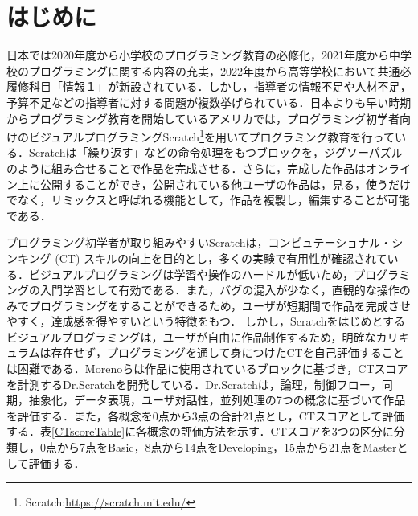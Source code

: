 \documentclass[submit,techrep,noauthor]{ipsj}
\begin{document}
\section{はじめに}

日本では2020年度から小学校のプログラミング教育の必修化，2021年度から中学校のプログラミングに関する内容の充実，2022年度から高等学校において共通必履修科目「情報１」が新設されている\cite{monkashou}．しかし，指導者の情報不足や人材不足，予算不足などの指導者に対する問題が複数挙げられている\cite{monkashou2}．日本よりも早い時期からプログラミング教育を開始しているアメリカでは，プログラミング初学者向けのビジュアルプログラミングScratch\footnote{Scratch:\url{https://scratch.mit.edu/}}\cite{resnick2009scratch}を用いてプログラミング教育を行っている．Scratchは「繰り返す」などの命令処理をもつブロックを，ジグソーパズルのように組み合せることで作品を完成させる．さらに，完成した作品はオンライン上に公開することができ，公開されている他ユーザの作品は，見る，使うだけでなく，リミックスと呼ばれる機能として，作品を複製し，編集することが可能である．

プログラミング初学者が取り組みやすいScratchは，コンピュテーショナル・シンキング (CT) \cite{wing2006computational}スキルの向上を目的とし，多くの実験で有用性が確認されている\cite{10.1145/2724660.2724674}\cite{hashitani2022scratch}\cite{10.1145/2818048.2819984}．ビジュアルプログラミングは学習や操作のハードルが低いため，プログラミングの入門学習として有効である\cite{1050845762811356288}．また，バグの混入が少なく，直観的な操作のみでプログラミングをすることができるため，ユーザが短期間で作品を完成させやすく，達成感を得やすいという特徴をもつ．
しかし，Scratchをはじめとするビジュアルプログラミングは，ユーザが自由に作品制作するため，明確なカリキュラムは存在せず，プログラミングを通して身につけたCTを自己評価することは困難である．Morenoらは作品に使用されているブロックに基づき，CTスコアを計測するDr.Scratchを開発している\cite{moreno2015dr}．Dr.Scratchは，論理，制御フロー，同期，抽象化，データ表現，ユーザ対話性，並列処理の7つの概念に基づいて作品を評価する．また，各概念を0点から3点の合計21点とし，CTスコアとして評価する．表\ref{CTscoreTable}に各概念の評価方法を示す．CTスコアを3つの区分に分類し，0点から7点をBasic，8点から14点をDeveloping，15点から21点をMasterとして評価する．
\end{document}
